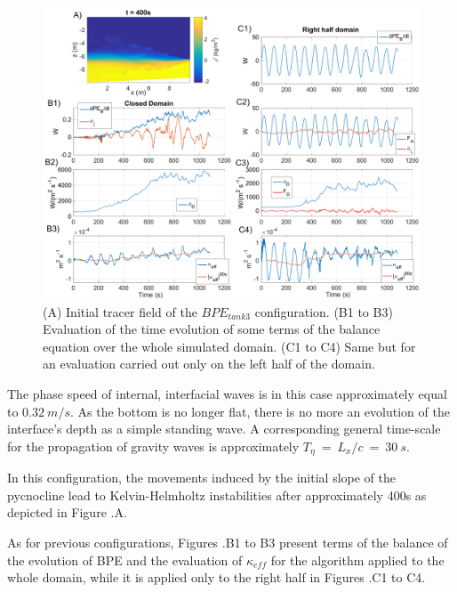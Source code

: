 \begin{figure}[h!]
\includegraphics[width=1.\textwidth]{./CHAP_BPE/Fig_TANK_pycbath2.png}
\caption[Initial tracer field and evaluation of $\kappa_{eff}$ for configuration $BPE_{tank3}$]{(A) Initial tracer field of the $BPE_{tank3}$ configuration. (B1 to B3) Evaluation of the time evolution of some terms of the balance equation  over the whole simulated domain. (C1 to C4) Same but for an evaluation carried out only on the left half of the domain.}
\label{figCbath}
\end{figure}

The phase speed of internal, interfacial waves is in this case approximately equal to $0.32\ m/s$. \color{red}As the bottom is no longer flat, there is no more an evolution of the interface's depth as a simple standing wave. A corresponding general time-scale for the propagation of gravity waves is approximately $T_{\eta}\ =\ L_x/c\ =\ 30\ s$.\color{black}

In this configuration, the movements induced by the initial slope of the pycnocline lead to Kelvin-Helmholtz instabilities after approximately 400s as depicted in Figure .A.

As for previous configurations, Figures .B1 to B3 present terms of the balance of the evolution of BPE and the evaluation of $\kappa_{eff}$ for the algorithm applied to the whole domain, while it is applied only to the right half in Figures .C1 to C4.

